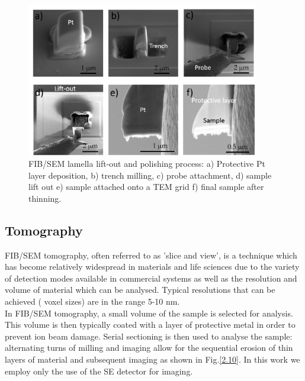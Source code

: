 \begin{figure}[!ht]
	\centering
	\includegraphics[width=0.9\textwidth]{Figs/Ch2/Lift-out.png}
	\caption{FIB/SEM lamella lift-out and polishing process: a) Protective Pt layer deposition, b) trench milling, c) probe attachment, d) sample lift out e) sample attached onto a TEM grid f) final sample after thinning.}
	\label{2.9}
\end{figure}
\FloatBarrier



\subsection{Tomography}
\label{FIBtomo}
FIB/SEM tomography, often referred to as 'slice and view', is a technique which has become relatively widespread in materials and life sciences due to the variety of detection modes available in commercial systems as well as the resolution and volume of material which can be analysed. Typical resolutions that can be achieved ( voxel sizes) are in the range 5-10 nm.\\
In FIB/SEM tomography, a small volume of the sample is selected for analysis. This volume is then typically coated with a layer of protective metal in order to prevent ion beam damage. Serial sectioning is then used to analyse the sample: alternating turns of milling and imaging allow for the sequential erosion of thin layers of material and subsequent imaging as shown in Fig.\ref{2.10}. In this work we employ only the use of the SE detector for imaging.


